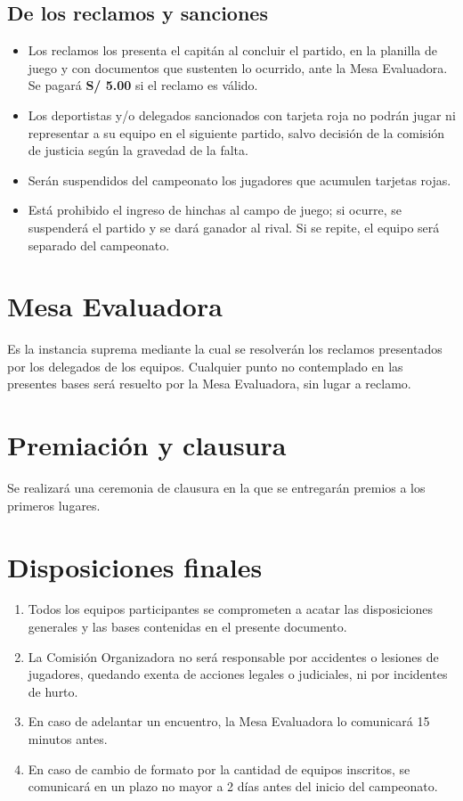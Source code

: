 	\subsection{De los reclamos y sanciones}

	\begin{itemize}
		\item Los reclamos los presenta el capitán al concluir el partido, en la planilla de juego y con documentos que sustenten lo ocurrido, ante la Mesa Evaluadora. Se pagará \textbf{S/ 5.00} si el reclamo es válido.
		\item Los deportistas y/o delegados sancionados con tarjeta roja no podrán jugar ni representar a su equipo en el siguiente partido, salvo decisión de la comisión de justicia según la gravedad de la falta.
		\item Serán suspendidos del campeonato los jugadores que acumulen tarjetas rojas.
		\item Está prohibido el ingreso de hinchas al campo de juego; si ocurre, se suspenderá el partido y se dará ganador al rival. Si se repite, el equipo será separado del campeonato.
	\end{itemize}

	\section{Mesa Evaluadora}

	Es la instancia suprema mediante la cual se resolverán los reclamos presentados por los delegados de los equipos. Cualquier punto no contemplado en las presentes bases será resuelto por la Mesa Evaluadora, sin lugar a reclamo.

	\section{Premiación y clausura}

	Se realizará una ceremonia de clausura en la que se entregarán premios a los primeros lugares.

	\section{Disposiciones finales}

	\begin{enumerate}
		\item Todos los equipos participantes se comprometen a acatar las disposiciones generales y las bases contenidas en el presente documento.
		\item La Comisión Organizadora no será responsable por accidentes o lesiones de jugadores, quedando exenta de acciones legales o judiciales, ni por incidentes de hurto.
		\item En caso de adelantar un encuentro, la Mesa Evaluadora lo comunicará 15 minutos antes.
		\item En caso de cambio de formato por la cantidad de equipos inscritos, se comunicará en un plazo no mayor a 2 días antes del inicio del campeonato.
	\end{enumerate}

